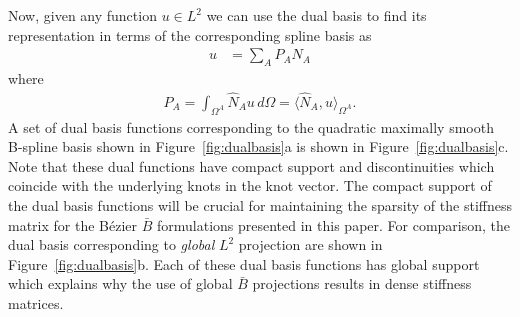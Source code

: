 \documentclass{article}
\begin{document}
Now, given any function $u \in L^2$ we can use the dual basis to find its representation in terms of the corresponding spline basis as
\begin{align}
  u &= \sum_A P_A N_A
\end{align}
where
\begin{align}
	P_A = \int_{\Omega^A} \hat{N}_{A} u \, d\Omega = \langle \hat{N}_A, u \rangle_{\Omega^A}.
\end{align}
A set of dual basis functions corresponding to the quadratic maximally smooth B-spline basis shown in Figure~\ref{fig:dualbasis}a is shown in Figure~\ref{fig:dualbasis}c. Note that these dual functions have compact support and discontinuities which coincide with the underlying knots in the knot vector. The compact support of the dual basis functions will be crucial for maintaining the sparsity of the stiffness matrix for the B\'{e}zier $\bar{B}$ formulations presented in this paper. For comparison, the dual basis corresponding to \textit{global} $L^2$ projection are shown in Figure~\ref{fig:dualbasis}b. Each of these dual basis functions has global support which explains why the use of global $\bar{B}$ projections results in dense stiffness matrices. 
\end{document}
